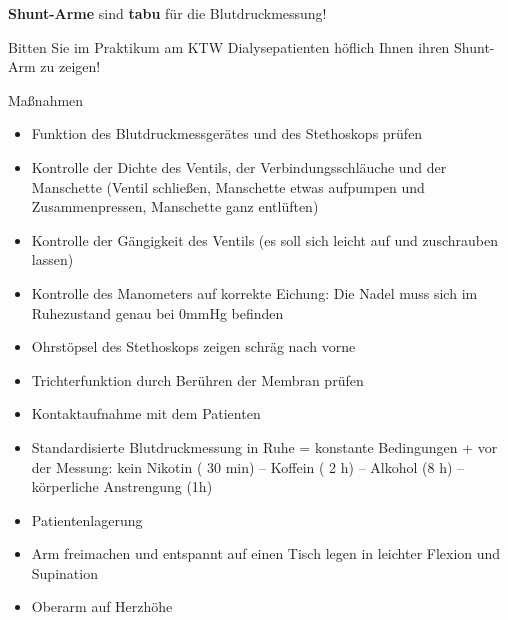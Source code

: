 \documentclass{article}
\newcommand\gEs[1]{\textbf{\textcolor[rgb]{0.0,0.0,0.5019608}{#1}}}
\newcommand\gEs[1]{\textbf{\textcolor[rgb]{0.0,0.0,0.5019608}{#1}}}
\begin{document}
{\mdseries\color{black}
\gEs{Shunt-Arme} sind \gEs{tabu}
f\"ur die Blutdruckmessung!}

{\mdseries
Bitten Sie im Praktikum am KTW Dialysepatienten h\"oflich Ihnen ihren
Shunt-Arm zu zeigen!}

{\mdseries\color{black}
Ma{\ss}nahmen}

\begin{itemize}
\item {\mdseries
Funktion des Blutdruckmessger\"ates und des Stethoskops pr\"ufen}

\end{itemize}
\begin{itemize}
\item {\mdseries
Kontrolle der Dichte des Ventils, der Verbindungsschl\"auche und der
Manschette (Ventil schlie{\ss}en, Manschette etwas aufpumpen und
Zusammenpressen, Manschette ganz entl\"uften)}

\item {\mdseries
Kontrolle der G\"angigkeit des Ventils (es soll sich leicht auf und
zuschrauben lassen)}

\item {\mdseries
Kontrolle des Manometers auf korrekte Eichung: Die Nadel muss sich im
Ruhezustand genau bei 0mmHg befinden}

\item {\mdseries
Ohrst\"opsel des Stethoskops zeigen schr\"ag nach vorne}

\item {\mdseries
Trichterfunktion durch Ber\"uhren der Membran pr\"ufen}

\end{itemize}
\begin{itemize}
\item {\mdseries
Kontaktaufnahme mit dem Patienten}

\end{itemize}
\begin{itemize}
\item {\mdseries
Standardisierte Blutdruckmessung in Ruhe = konstante Bedingungen + vor
der Messung: kein Nikotin ( 30 min) -- Koffein ( 2 h) -- Alkohol (8 h) 
{}-- k\"orperliche Anstrengung (1h)}

\end{itemize}
\begin{itemize}
\item {\mdseries
Patientenlagerung}

\end{itemize}
\begin{itemize}
\item {\mdseries
Arm freimachen und entspannt auf einen Tisch legen in leichter Flexion
und Supination}

\item {\mdseries
Oberarm auf Herzh\"ohe}

\end{itemize}
\end{document}
